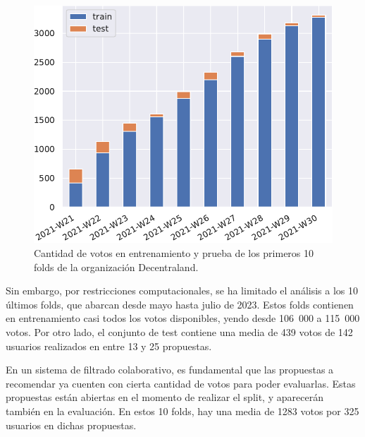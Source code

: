 \begin{figure}
    \centering
    \includegraphics[width=.6\linewidth]{figures/04_validacion/10_first_folds_W-THU_True_Decentraland.pdf}
    \caption{Cantidad de votos en entrenamiento y prueba de los primeros 10 folds de la organización Decentraland.}
    \label{fig:04-first-ten-folds}
\end{figure}

Sin embargo, por restricciones computacionales, se ha limitado el análisis a los 10 últimos folds, que abarcan desde mayo hasta julio de 2023. Estos folds contienen en entrenamiento casi todos los votos disponibles, yendo desde 106~000 a 115~000 votos. Por otro lado, el conjunto de test contiene una media de 439 votos de 142 usuarios realizados en entre 13 y 25 propuestas.

En un sistema de filtrado colaborativo, es fundamental que las propuestas a recomendar ya cuenten con cierta cantidad de votos para poder evaluarlas. Estas propuestas están abiertas en el momento de realizar el split, y aparecerán también en la evaluación. En estos 10 folds, hay una media de 1283 votos por 325 usuarios en dichas propuestas.

